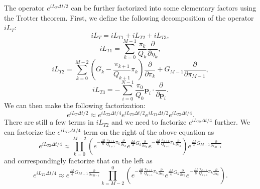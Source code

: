 \documentclass[12pt,a4paper]{report}
\newcommand{\vect}[1]{\boldsymbol{#1}}
\begin{document}
The operator $e^{iL_T\Delta t/2}$ can be further factorized into some elementary factors using the Trotter theorem. First, we define the following decomposition of the operator $iL_T$:
\begin{equation}
iL_T =  iL_{T1} + iL_{T2} + iL_{T3},
\end{equation}
\begin{equation}
iL_{T1} =
\sum_{k=0}^{M-1} \frac{\pi_k}{Q_k}\frac{\partial}{\partial \eta_k},
\end{equation}
\begin{equation}
iL_{T2} =
\sum_{k=0}^{M-2} \left(G_k - \frac{\pi_{k+1}}{Q_{k+1}}\pi_k\right)
     \frac{\partial}{\partial \pi_k}                               +
G_{M-1} \frac{\partial}{\partial \pi_{M-1}},
\end{equation}
\begin{equation}
iL_{T3} = -\sum_{i=0}^{N-1}
\frac{\pi_0}{Q_0} \vect{p}_i \cdot \frac{\partial}{\partial \vect{p}_i}.
\end{equation}
We can then make the following factorization:
\begin{equation}
e^{iL_T\Delta t/2} \approx
e^{iL_{T2}\Delta t/4}
e^{iL_{T3}\Delta t/2}
e^{iL_{T1}\Delta t/2}
e^{iL_{T2}\Delta t/4}.
\end{equation}
There are still a few terms in $iL_{T2}$ and we need to factorize $e^{iL_{T2}\Delta t/4}$ further. We can factorize the $e^{iL_{T2}\Delta t/4}$ term on the right of the above equation as
\begin{equation}
e^{iL_{T2}\Delta t/4} \approx
\prod_{k=0}^{M-2}
\left(
e^{-\frac{\Delta t}{8} \frac{\pi_{k+1}}{Q_{k+1}}\pi_k \frac{\partial}{\partial \pi_k} }
e^{\frac{\Delta t}{4} G_k \frac{\partial}{\partial \pi_k} }
e^{-\frac{\Delta t}{8} \frac{\pi_{k+1}}{Q_{k+1}}\pi_k \frac{\partial}{\partial \pi_k} }
\right)
e^{\frac{\Delta t}{4} G_{M-1} \frac{\partial}{\partial \pi_{M-1}} }
\end{equation}
and correspondingly factorize that on the left as
\begin{equation}
e^{iL_{T2}\Delta t/4} \approx
e^{\frac{\Delta t}{4} G_{M-1} \frac{\partial}{\partial \pi_{M-1}} }
\prod_{k=M-2}^{0}
\left(
e^{-\frac{\Delta t}{8} \frac{\pi_{k+1}}{Q_{k+1}}\pi_k \frac{\partial}{\partial \pi_k} }
e^{\frac{\Delta t}{4} G_k \frac{\partial}{\partial \pi_k} }
e^{-\frac{\Delta t}{8} \frac{\pi_{k+1}}{Q_{k+1}}\pi_k \frac{\partial}{\partial \pi_k} }
\right).
\end{equation}
\end{document}
